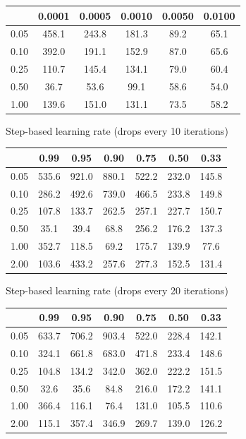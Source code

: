 \documentclass[a4paper,14pt,oneside,openany]{memoir}
\begin{document}
	\begin{tabular}{|c|c|c|c|c|c|}
	\hline 
	 &0.0001 &0.0005 &0.0010 &0.0050 &0.0100 \\
	 \hline 
	0.05 &458.1 &243.8 &181.3 &89.2 &65.1 \\
	 \hline 
	0.10 &392.0 &191.1 &152.9 &87.0 &65.6 \\
	 \hline 
	0.25 &110.7 &145.4 &134.1 &79.0 &60.4 \\
	 \hline 
	0.50 &36.7 &53.6 &99.1 &58.6 &54.0 \\
	 \hline 
	1.00 &139.6 &151.0 &131.1 &73.5 &58.2 \\
	 \hline 
	
	\end{tabular}
	
	Step-based learning rate (drops every 10 iterations) 
	
	\begin{tabular}{|c|c|c|c|c|c|c|}
	\hline 
	 &0.99 &0.95 &0.90 &0.75 &0.50 &0.33 \\
	 \hline 
	0.05 &535.6 &921.0 &880.1 &522.2 &232.0 &145.8 \\
	 \hline 
	0.10 &286.2 &492.6 &739.0 &466.5 &233.8 &149.8 \\
	 \hline 
	0.25 &107.8 &133.7 &262.5 &257.1 &227.7 &150.7 \\
	 \hline 
	0.50 &35.1 &39.4 &68.8 &256.2 &176.2 &137.3 \\
	 \hline 
	1.00 &352.7 &118.5 &69.2 &175.7 &139.9 &77.6 \\
	 \hline 
	2.00 &103.6 &433.2 &257.6 &277.3 &152.5 &131.4 \\
	 \hline 
	
	\end{tabular}
	
	Step-based learning rate (drops every 20 iterations) 
	
	\begin{tabular}{|c|c|c|c|c|c|c|}
	\hline 
	 &0.99 &0.95 &0.90 &0.75 &0.50 &0.33 \\
	 \hline 
	0.05 &633.7 &706.2 &903.4 &522.0 &228.4 &142.1 \\
	 \hline 
	0.10 &324.1 &661.8 &683.0 &471.8 &233.4 &148.6 \\
	 \hline 
	0.25 &104.8 &134.2 &342.0 &362.0 &222.2 &151.5 \\
	 \hline 
	0.50 &32.6 &35.6 &84.8 &216.0 &172.2 &141.1 \\
	 \hline 
	1.00 &366.4 &116.1 &76.4 &131.0 &105.5 &110.6 \\
	 \hline 
	2.00 &115.1 &357.4 &346.9 &269.7 &139.0 &126.2 \\
	 \hline 
	
	\end{tabular}
	
\end{document}
